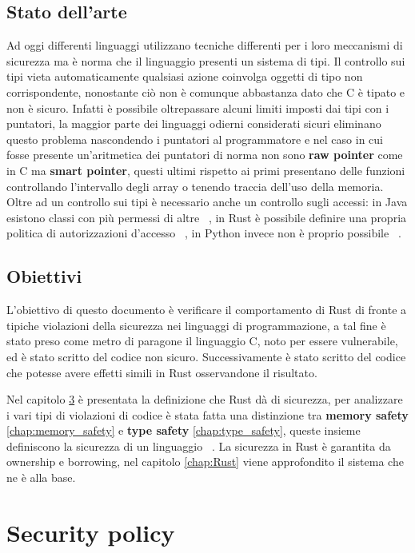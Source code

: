 \documentclass[Lau,binding=0.6cm]{sapthesis}
\begin{document}
\section {Stato dell'arte}
Ad oggi differenti linguaggi utilizzano tecniche differenti per i loro meccanismi di sicurezza ma è norma che il linguaggio presenti un sistema di tipi.
Il controllo sui tipi vieta automaticamente qualsiasi azione coinvolga oggetti di tipo non corrispondente, nonostante ciò non è comunque abbastanza dato che C è tipato e non è sicuro.
Infatti è possibile oltrepassare alcuni limiti imposti dai tipi con i puntatori, la maggior parte dei linguaggi odierni considerati sicuri eliminano questo problema nascondendo i puntatori al programmatore e nel caso in cui fosse presente un'aritmetica dei puntatori di norma non sono \textbf{raw pointer} come in C ma \textbf{smart pointer}, questi ultimi rispetto ai primi presentano delle funzioni controllando l'intervallo degli array o tenendo traccia dell'uso della memoria.
Oltre ad un controllo sui tipi è necessario anche un controllo sugli accessi: in Java esistono classi con più permessi di altre ~\cite{java:privilege}, in Rust è possibile definire una propria politica di autorizzazioni d'accesso ~\cite{rust:auth}, in Python invece non è proprio possibile ~\cite{python:privilege}.

\section{Obiettivi}
L'obiettivo di questo documento è verificare il comportamento di Rust di fronte a tipiche violazioni della sicurezza nei linguaggi di programmazione, a tal fine è stato preso come metro di paragone il linguaggio C, noto per essere vulnerabile, ed è stato scritto del codice non sicuro.
Successivamente è stato scritto del codice che potesse avere effetti simili in Rust osservandone il risultato.

Nel capitolo \ref{chap:security_policy} è presentata la definizione che Rust dà di sicurezza, per analizzare i vari tipi di violazioni di codice è stata fatta una distinzione tra \textbf{memory safety} \ref{chap:memory_safety} e \textbf{type safety} \ref{chap:type_safety}, queste insieme definiscono la sicurezza di un linguaggio ~\cite{nino:security_programming_language}.
La sicurezza in Rust è garantita da ownership e borrowing, nel capitolo \ref{chap:Rust} viene approfondito il sistema che ne è alla base.


\chapter{Security policy} \label{chap:security_policy}
\end{document}
